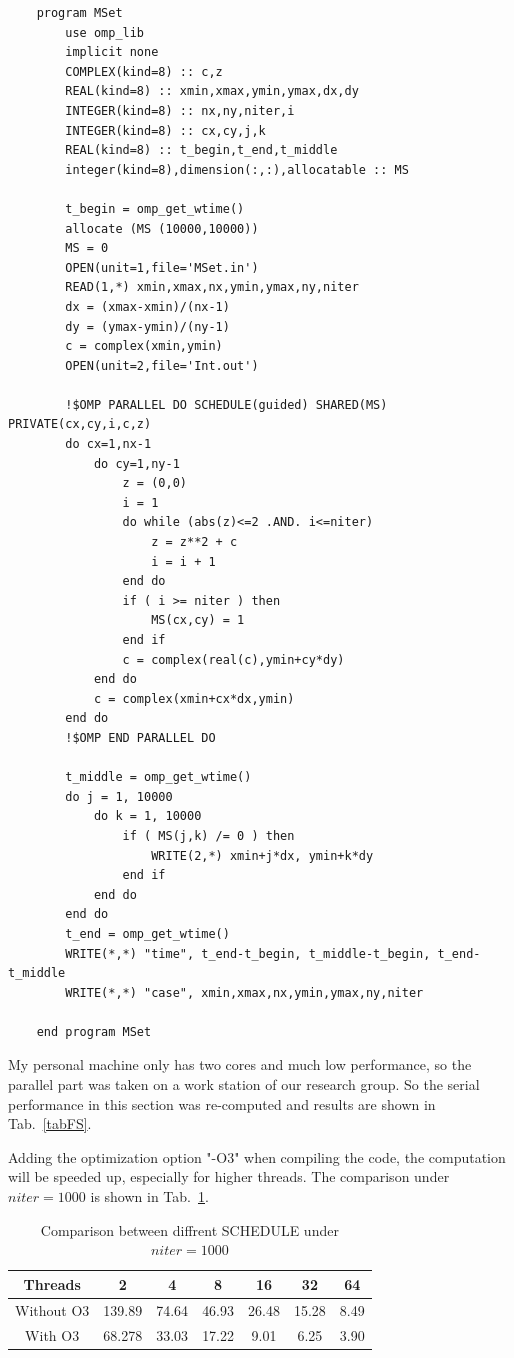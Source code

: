 \documentclass[letterpaper,10pt]{article}
\begin{document}
{\small\begin{framed}
  \begin{lstlisting}
    program MSet
        use omp_lib
        implicit none
        COMPLEX(kind=8) :: c,z
        REAL(kind=8) :: xmin,xmax,ymin,ymax,dx,dy
        INTEGER(kind=8) :: nx,ny,niter,i
        INTEGER(kind=8) :: cx,cy,j,k
        REAL(kind=8) :: t_begin,t_end,t_middle
        integer(kind=8),dimension(:,:),allocatable :: MS

        t_begin = omp_get_wtime()
        allocate (MS (10000,10000))
        MS = 0
        OPEN(unit=1,file='MSet.in')
        READ(1,*) xmin,xmax,nx,ymin,ymax,ny,niter
        dx = (xmax-xmin)/(nx-1)
        dy = (ymax-ymin)/(ny-1)
        c = complex(xmin,ymin)
        OPEN(unit=2,file='Int.out')
        
        !$OMP PARALLEL DO SCHEDULE(guided) SHARED(MS) PRIVATE(cx,cy,i,c,z)
        do cx=1,nx-1
            do cy=1,ny-1
                z = (0,0)
                i = 1
                do while (abs(z)<=2 .AND. i<=niter)
                    z = z**2 + c
                    i = i + 1
                end do
                if ( i >= niter ) then
                    MS(cx,cy) = 1
                end if
                c = complex(real(c),ymin+cy*dy)
            end do
            c = complex(xmin+cx*dx,ymin)
        end do
        !$OMP END PARALLEL DO
        
        t_middle = omp_get_wtime()
        do j = 1, 10000
            do k = 1, 10000
                if ( MS(j,k) /= 0 ) then
                    WRITE(2,*) xmin+j*dx, ymin+k*dy
                end if
            end do
        end do
        t_end = omp_get_wtime()
        WRITE(*,*) "time", t_end-t_begin, t_middle-t_begin, t_end-t_middle
        WRITE(*,*) "case", xmin,xmax,nx,ymin,ymax,ny,niter 

    end program MSet
    \end{lstlisting}
\end{framed}}

My personal machine only has two cores and much low performance, so the parallel part was taken on 
a work station of our research group. So the serial performance in this section was re-computed and 
results are shown in Tab.~\ref{tabFS}. 

Adding the optimization option "-O3" when compiling the code, the computation will be speeded up, especially 
for higher threads. The comparison under $niter=1000$ is shown in Tab.~\ref{tabComO3}. 
\begin{table}
  \centering  
  \caption{Comparison between diffrent SCHEDULE under $niter=1000$}\label{tabComO3}
  \begin{tabular}{ccccccc}
    \hline
    Threads & 2 & 4 & 8 & 16 &32 &64\\
    \hline
    Without O3 & 139.89& 74.64& 46.93 &26.48&15.28&8.49\\
    With O3 & 68.278& 33.03& 17.22&9.01&6.25&3.90\\
    \hline
  \end{tabular}
\end{table}
\end{document}
